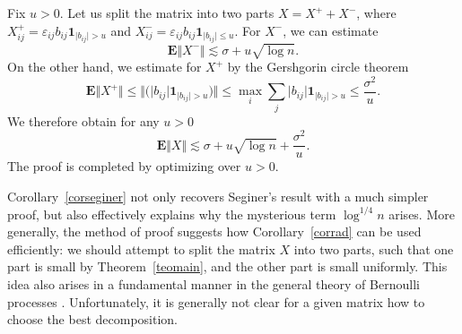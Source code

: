\documentclass[aop,MSNbibl,dvips]{arximspdf}
\newcommand{\rrvert}{\vert}
\newcommand{\rrVert}{\Vert}
\newcommand{\llvert}{\vert}
\newcommand{\llVert}{\Vert}
\newcommand{\EE}{\mathbf{E}}
\begin{document}
\begin{pf}
Fix $u>0$. Let us split the matrix into two parts $X=X^+ + X^-$, where
$X^+_{ij}=\varepsilon_{ij}b_{ij}\mathbf{1}_{\llvert b_{ij}\rrvert
>u}$ and
$X^-_{ij}=\varepsilon_{ij}b_{ij}\mathbf{1}_{\llvert b_{ij}\rrvert \le u}$.
For $X^-$, we can estimate
%
\[
\EE\bigl\llVert X^-\bigr\rrVert\lesssim\sigma+ u\sqrt{\log n}. %
\]
%
On the other hand, we estimate for $X^+$ by the
Gershgorin circle theorem
%
\[
\EE\bigl\llVert X^+\bigr\rrVert\le\bigl\llVert\bigl(\llvert b_{ij}
\rrvert\mathbf{1}_{\llvert b_{ij}\rrvert >u}\bigr)\bigr\rrVert\le
\max_i
\sum_j \llvert b_{ij}\rrvert
\mathbf{1}_{\llvert b_{ij}\rrvert >u} \le\frac{\sigma^2}{u}. %
\]
%
We therefore obtain for any $u>0$
%
\[
\EE\llVert X\rrVert\lesssim\sigma+ u\sqrt{\log n} + \frac{\sigma^2}{u}.
%
\]
%
The proof is completed by optimizing over $u>0$.
\end{pf}

Corollary~\ref{corseginer} not only recovers Seginer's result with a much
simpler proof, but also effectively explains why the mysterious term
$\log^{1/4}n$ arises. More generally, the method of proof suggests how
Corollary~\ref{corrad} can be used efficiently: we should attempt to
split the matrix $X$ into two parts, such that one part is small by
Theorem~\ref{teomain}, and the other part is small uniformly. This idea
also arises in a fundamental manner in the general theory of Bernoulli
processes \cite{Tal14}. Unfortunately, it is generally not clear for a
given matrix how to choose the best decomposition.
\end{document}
